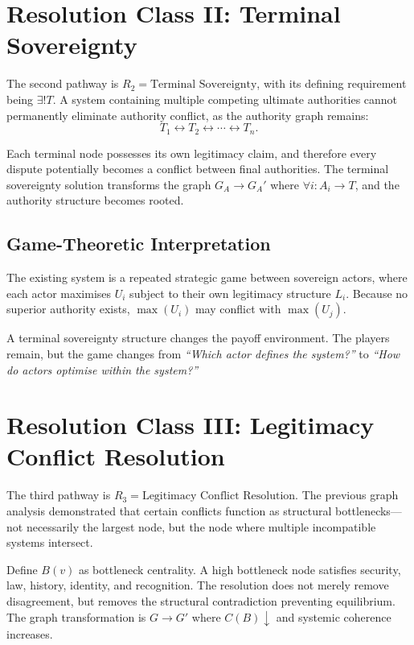 \documentclass[11pt,openany]{book}
\theoremstyle{plain}
\theoremstyle{definition}
\begin{document}
\section*{Resolution Class II: Terminal Sovereignty}

The second pathway is \(R_2 = \text{Terminal Sovereignty}\), with its defining requirement being \(\exists ! T\). A system containing multiple competing ultimate authorities cannot permanently eliminate authority conflict, as the authority graph remains:
\[
T_1 \longleftrightarrow T_2 \longleftrightarrow \cdots \longleftrightarrow T_n.
\]

Each terminal node possesses its own legitimacy claim, and therefore every dispute potentially becomes a conflict between final authorities. The terminal sovereignty solution transforms the graph \(G_A \to G_A'\) where \(\forall i: A_i \to T\), and the authority structure becomes rooted.

\subsection*{Game-Theoretic Interpretation}

The existing system is a repeated strategic game between sovereign actors, where each actor maximises \(U_i\) subject to their own legitimacy structure \(L_i\). Because no superior authority exists, \(\max(U_i)\) may conflict with \(\max(U_j)\). 

A terminal sovereignty structure changes the payoff environment. The players remain, but the game changes from \textit{``Which actor defines the system?''} to \textit{``How do actors optimise within the system?''}

\section*{Resolution Class III: Legitimacy Conflict Resolution}

The third pathway is \(R_3 = \text{Legitimacy Conflict Resolution}\). The previous graph analysis demonstrated that certain conflicts function as structural bottlenecks—not necessarily the largest node, but the node where multiple incompatible systems intersect. 

Define \(B(v)\) as bottleneck centrality. A high bottleneck node satisfies security, law, history, identity, and recognition. The resolution does not merely remove disagreement, but removes the structural contradiction preventing equilibrium. The graph transformation is \(G \to G'\) where \(C(B) \downarrow\) and systemic coherence increases.
\end{document}
